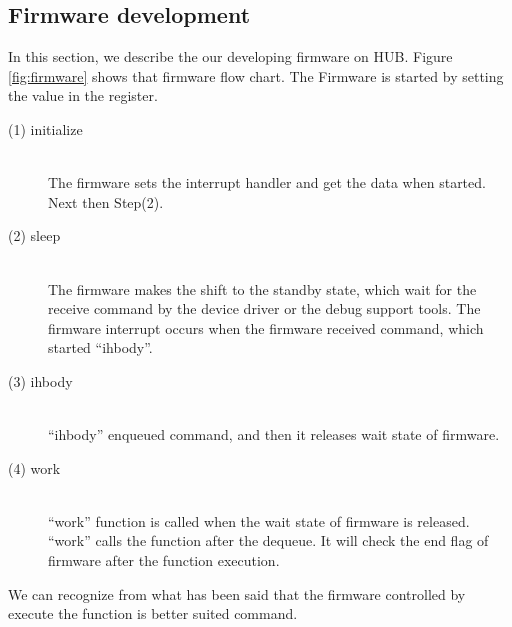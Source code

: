 \subsection{Firmware development}
In this section, we describe the our developing firmware on HUB.
Figure \ref{fig:firmware} shows that firmware flow chart.
The Firmware is started by setting the value in the register.

\begin{description}
\item[ (1) initialize]\mbox{}\\
The firmware sets the interrupt handler and get the data when started.
Next then Step(2).
\item[ (2) sleep]\mbox{}\\
The firmware makes the shift to the standby state, which wait for the receive command by the device driver or the debug support tools.
The firmware interrupt occurs when the firmware received command, which started ``ihbody''. 

\item[ (3) ihbody] \mbox{}\\
``ihbody'' enqueued command, and then it releases wait state of firmware.
\item[ (4) work] \mbox{}\\
``work'' function is called when the wait state of firmware is released.
``work'' calls the function after the dequeue.
It will check the end flag of firmware after the function execution.
\end{description}
We can recognize from what has been said that the firmware controlled by execute the function is better suited command.

